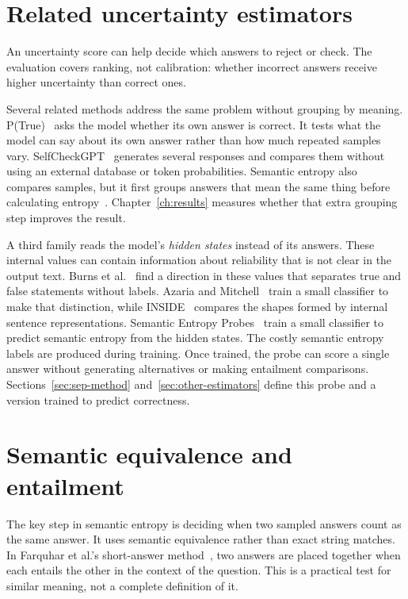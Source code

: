 \section{Related uncertainty estimators}
\label{sec:calibration-abstention}

An uncertainty score can help decide which answers to reject or check.
The evaluation covers ranking, not calibration: whether incorrect answers
receive higher uncertainty than correct ones.

Several related methods address the same problem without grouping by meaning.
P(True)~\cite{kadavath_language_models_know_2022} asks the model whether its own
answer is correct. It tests what the model can say about its own answer rather
than how much repeated samples vary. SelfCheckGPT~\cite{manakul_selfcheckgpt_2023}
generates several responses and compares them without using an external
database or token probabilities. Semantic entropy also compares samples, but it
first groups answers that mean the same thing before calculating
entropy~\cite{kuhn_semantic_uncertainty_2023,semantic_entropy_nature_2024}.
Chapter~\ref{ch:results} measures whether that extra grouping step improves
the result.

A third family reads the model's \emph{hidden states} instead of its answers.
These internal values can contain information about reliability that is not
clear in the output text. Burns et al.~\cite{burns_latent_knowledge_2023} find a
direction in these values that separates true and false statements without
labels. Azaria and Mitchell~\cite{azaria_internal_state_lying_2023} train a
small classifier to make that distinction, while INSIDE~\cite{chen_inside_2024}
compares the shapes formed by internal sentence representations. Semantic Entropy
Probes~\cite{kossen_semantic_entropy_probes_2024} train a small classifier to
predict semantic entropy from the hidden states. The costly semantic entropy
labels are produced during training. Once trained, the probe can score a single
answer without generating alternatives or making entailment comparisons.
Sections~\ref{sec:sep-method} and~\ref{sec:other-estimators} define this
probe and a version trained to predict correctness.

\section{Semantic equivalence and entailment}
\label{sec:semantic-equivalence}

The key step in semantic entropy is deciding when two sampled answers count as
the same answer. It uses semantic equivalence rather than exact string matches.
In Farquhar et al.'s short-answer method~\cite{semantic_entropy_nature_2024},
two answers are placed together when each entails the other in the context of
the question.
This is a practical test for similar meaning, not a complete definition of it.

